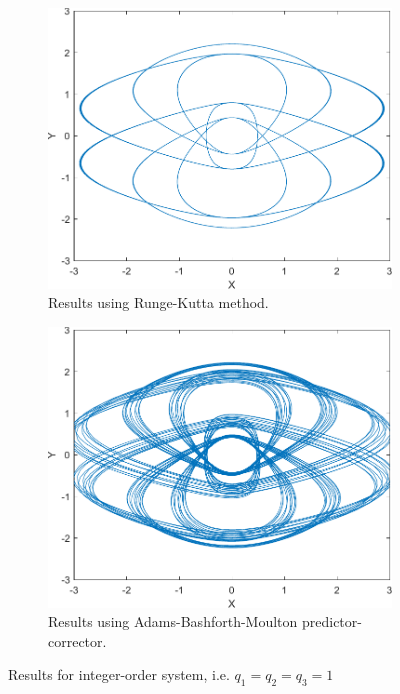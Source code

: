\begin{figure}[H]
  \centering
  \begin{subfigure}[H]{0.4\textwidth}
    \includegraphics[scale = 0.5]{files/IntegerKutta.pdf}
    \centering
    \caption{Results using Runge-Kutta method.}
  \end{subfigure}
  \hspace{1cm}
  \begin{subfigure}[H]{0.4\textwidth}
    \includegraphics[scale = 0.5]{files/IntegerAdams.pdf}
    \centering
    \caption{Results using Adams-Bashforth-Moulton predictor-corrector.}
    \label{}
  \end{subfigure}
  \caption{Results for integer-order system, i.e. $q_1=q_2=q_3=1$}
  \label{fig:6}
\end{figure}


